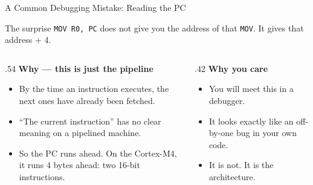 \documentclass[9pt,aspectratio=169,xcolor=table]{beamer}
\begin{document}
\begin{frame}{A Common Debugging Mistake: Reading the PC}
    \begin{block}{The surprise}
        \texttt{MOV R0, PC} does \alert{not} give you the address of that
        \texttt{MOV}. It gives that address \alert{+ 4}.
    \end{block}

    \vspace{2mm}
    \begin{columns}[T]
    \begin{column}{.54\textwidth}
        \textbf{Why --- this is just the pipeline}
        \begin{itemize}
            \item By the time an instruction executes, the next ones
                  have \alert{already been fetched}.
            \item ``The current instruction'' has no clear meaning on
                  a pipelined machine.
            \item So the PC runs ahead. On the Cortex-M4, it runs
                  4 bytes ahead: two 16-bit instructions.
        \end{itemize}
    \end{column}
    \begin{column}{.42\textwidth}
        \textbf{Why you care}
        \begin{itemize}
            \item You will meet this in a debugger.
            \item It looks exactly like an off-by-one bug in your own code.
            \item It is not. It is the architecture.
        \end{itemize}
    \end{column}
    \end{columns}
\end{frame}
\end{document}
